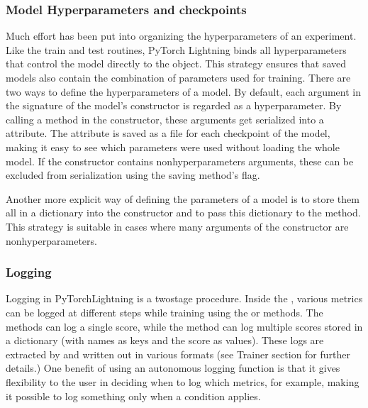 \documentclass[letterpaper,10pt,english]{jupyterBook}
\begin{document}
\subsubsection{Model Hyperparameters and checkpoints}
\label{\detokenize{PyTorchLightning:model-hyperparameters-and-checkpoints}}
\sphinxAtStartPar
Much effort has been put into organizing the hyperparameters of an experiment.
Like the train and test routines, PyTorch Lightning binds all hyperparameters that control the model directly to the object.
This strategy ensures that saved models also contain the combination of parameters used for training.
There are two ways to define the hyperparameters of a model.
By default, each argument in the signature of the model’s constructor is regarded as a hyperparameter.
By calling a \sphinxhyphen{}method in the constructor, these arguments get serialized into a \sphinxhyphen{}attribute.
The \sphinxhyphen{}attribute is saved as a \sphinxhyphen{}file for each checkpoint of the model, making it easy to see which parameters were used without loading the whole model.
If the constructor contains non\sphinxhyphen{}hyperparameters arguments, these can be excluded from serialization using the saving method’s  flag.

\sphinxAtStartPar
Another more explicit way of defining the parameters of a model is to store them all in a dictionary into the constructor and to pass this dictionary to the \sphinxhyphen{}method.
This strategy is suitable in cases where many arguments of the constructor are non\sphinxhyphen{}hyperparameters.


\subsubsection{Logging}
\label{\detokenize{PyTorchLightning:logging}}
\sphinxAtStartPar
Logging in PyTorch\sphinxhyphen{}Lightning is a two\sphinxhyphen{}stage procedure.
Inside the , various metrics can be logged at different steps while training using the \sphinxhyphen{} or \sphinxhyphen{}methods.
The \sphinxhyphen{}methods can log a single score, while the \sphinxhyphen{}method can log multiple scores stored in a dictionary (with names as keys and the score as values).
These logs are extracted by  and written out in various formats (see Trainer section for further details.)
One benefit of using an autonomous logging function is that it gives flexibility to the user in deciding when to log which metrics, for example, making it possible to log something only when a condition applies.
\end{document}
